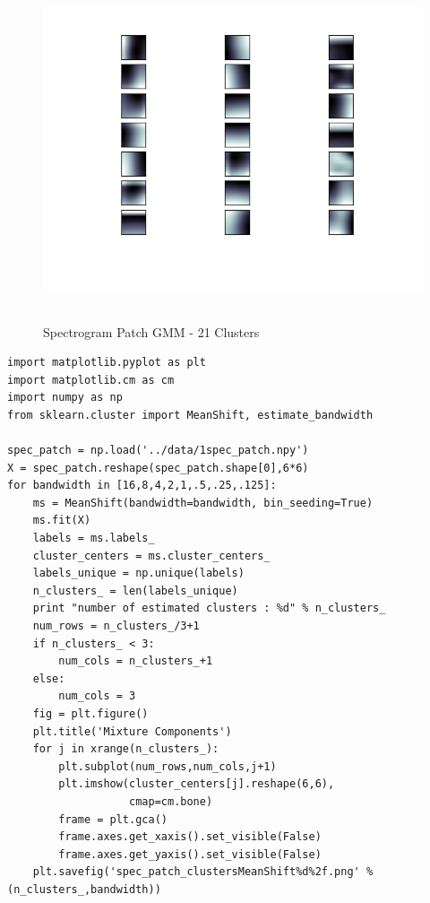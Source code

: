 \documentclass[11pt]{article}
\begin{document}
\begin{figure}[htb]
\centering
\includegraphics[height=10cm]{./spec_patch_clustersGMM21.png}
\caption{\label{fig:spec_patch_clustersGMM21}Spectrogram Patch GMM - 21 Clusters}
\end{figure}




\begin{verbatim}
import matplotlib.pyplot as plt
import matplotlib.cm as cm
import numpy as np
from sklearn.cluster import MeanShift, estimate_bandwidth

spec_patch = np.load('../data/1spec_patch.npy')
X = spec_patch.reshape(spec_patch.shape[0],6*6)
for bandwidth in [16,8,4,2,1,.5,.25,.125]:
    ms = MeanShift(bandwidth=bandwidth, bin_seeding=True)
    ms.fit(X)
    labels = ms.labels_
    cluster_centers = ms.cluster_centers_
    labels_unique = np.unique(labels)
    n_clusters_ = len(labels_unique)
    print "number of estimated clusters : %d" % n_clusters_
    num_rows = n_clusters_/3+1
    if n_clusters_ < 3:
        num_cols = n_clusters_+1
    else:
        num_cols = 3
    fig = plt.figure()
    plt.title('Mixture Components')
    for j in xrange(n_clusters_):
        plt.subplot(num_rows,num_cols,j+1)
        plt.imshow(cluster_centers[j].reshape(6,6),
                   cmap=cm.bone)
        frame = plt.gca()
        frame.axes.get_xaxis().set_visible(False)
        frame.axes.get_yaxis().set_visible(False)
    plt.savefig('spec_patch_clustersMeanShift%d%2f.png' % (n_clusters_,bandwidth))
\end{verbatim}
\end{document}
